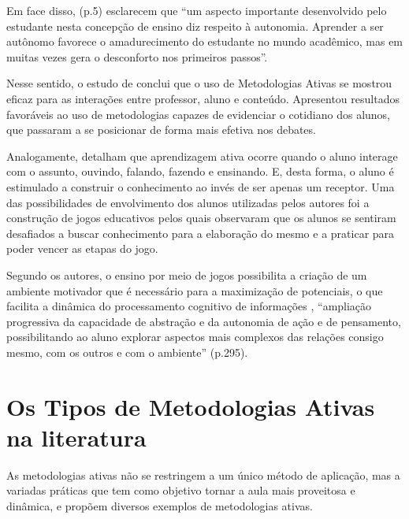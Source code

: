 Em face disso,  (p.5) esclarecem que ``um aspecto importante desenvolvido pelo estudante nesta concepção de ensino diz respeito à autonomia. Aprender a ser autônomo favorece o amadurecimento do estudante no mundo acadêmico, mas em muitas vezes gera o desconforto nos primeiros passos''.

Nesse sentido, o estudo de  conclui que o uso de Metodologias Ativas se mostrou eficaz para as interações entre professor, aluno e conteúdo.  Apresentou resultados favoráveis ao uso de metodologias capazes de evidenciar o cotidiano dos alunos, que passaram a se posicionar de forma mais efetiva nos debates.

Analogamente,  detalham que aprendizagem ativa ocorre quando o aluno interage com o assunto, ouvindo, falando, fazendo e ensinando. E, desta forma, o aluno é estimulado a construir o conhecimento ao invés de ser apenas um receptor. Uma das possibilidades de envolvimento dos alunos utilizadas pelos autores foi a construção de jogos educativos pelos quais observaram que os alunos se sentiram desafiados a buscar conhecimento para a elaboração do mesmo e a praticar para poder vencer as etapas do jogo.

Segundo os autores, o ensino por meio de jogos possibilita a criação de um ambiente motivador que é necessário para a maximização de potenciais, o que facilita a dinâmica do processamento cognitivo de informações  \cite{CARVALHO2021}, ``ampliação progressiva da capacidade de abstração e da autonomia de ação e de pensamento, possibilitando ao aluno explorar aspectos mais complexos das relações consigo mesmo, com os outros e com o ambiente'' \cite{Educacao.SecretariadeEducacaoFundamental2017}  (p.295).

\section{Os Tipos de Metodologias Ativas na literatura}

As metodologias ativas não se restringem a um único método de aplicação, mas a variadas práticas que tem como objetivo tornar a aula mais proveitosa e dinâmica, e  propõem diversos exemplos de metodologias ativas.

